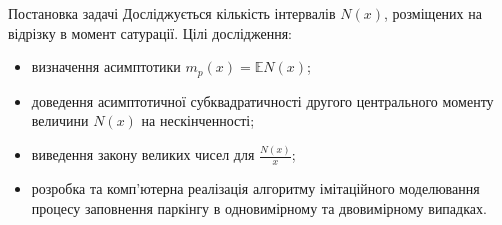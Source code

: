 \begin{frame}{Постановка задачі}
	Досліджується кількість інтервалів $N(x)$, розміщених на відрізку в момент сатурації.
	Цілі дослідження:
	\begin{itemize}
		\item визначення асимптотики $m_{p}(x) = \mathbb{E}N(x)$;
		\item доведення асимптотичної субквадратичності другого центрального моменту величини $N(x)$ на нескінченності;
		\item виведення закону великих чисел для $\frac{N(x)}{x}$;
		\item розробка та комп'ютерна реалізація алгоритму імітаційного моделювання процесу заповнення паркінгу в одновимірному та двовимірному випадках.
	\end{itemize}
	\note{
	}
\end{frame}